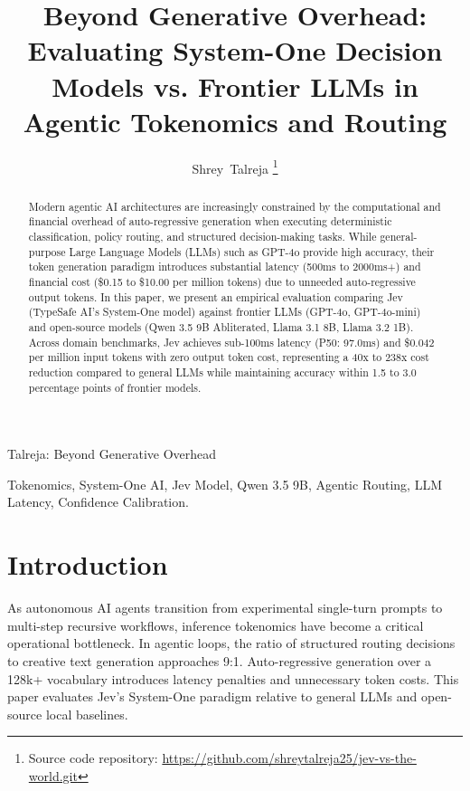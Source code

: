 \documentclass[10pt,journal,compsoc]{IEEEtran}
\begin{document}
\title{Beyond Generative Overhead: Evaluating System-One Decision Models vs. Frontier LLMs in Agentic Tokenomics and Routing}

\author{Shrey~Talreja%
\thanks{Source code repository: \url{https://github.com/shreytalreja25/jev-vs-the-world.git}}}

%
{Talreja: Beyond Generative Overhead}

\maketitle

\begin{abstract}
Modern agentic AI architectures are increasingly constrained by the computational and financial overhead of auto-regressive generation when executing deterministic classification, policy routing, and structured decision-making tasks. While general-purpose Large Language Models (LLMs) such as GPT-4o provide high accuracy, their token generation paradigm introduces substantial latency (500ms to 2000ms+) and financial cost (\$0.15 to \$10.00 per million tokens) due to unneeded auto-regressive output tokens. In this paper, we present an empirical evaluation comparing Jev (TypeSafe AI's System-One model) against frontier LLMs (GPT-4o, GPT-4o-mini) and open-source models (Qwen 3.5 9B Abliterated, Llama 3.1 8B, Llama 3.2 1B). Across domain benchmarks, Jev achieves sub-100ms latency (P50: 97.0ms) and \$0.042 per million input tokens with zero output token cost, representing a 40x to 238x cost reduction compared to general LLMs while maintaining accuracy within 1.5 to 3.0 percentage points of frontier models.
\end{abstract}

\begin{IEEEkeywords}
Tokenomics, System-One AI, Jev Model, Qwen 3.5 9B, Agentic Routing, LLM Latency, Confidence Calibration.
\end{IEEEkeywords}

\section{Introduction}
As autonomous AI agents transition from experimental single-turn prompts to multi-step recursive workflows, inference tokenomics have become a critical operational bottleneck. In agentic loops, the ratio of structured routing decisions to creative text generation approaches 9:1. Auto-regressive generation over a 128k+ vocabulary introduces latency penalties and unnecessary token costs. This paper evaluates Jev's System-One paradigm relative to general LLMs and open-source local baselines.
\end{document}
